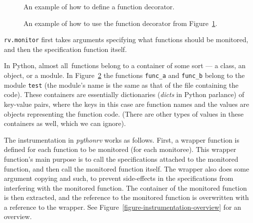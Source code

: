 \documentclass[a4paper,11pt]{kth-mag}
\begin{document}
\begin{figure}[h!]
	\begin{center}
	\begin{minipage}{0.7\textwidth}
	
	\end{minipage}
	\end{center}

	\caption{An example of how to define a function decorator.}
	\label{figure-function-decorator}
\end{figure}

\begin{figure}[h!]
	\begin{center}
	\begin{minipage}{0.7\textwidth}
	
	\end{minipage}
	\end{center}

	\caption{An example of how to use the function decorator from
	Figure~\ref{figure-function-decorator}.}
	\label{figure-function-decorator-usages}
\end{figure}

\texttt{rv.monitor} first takes arguments specifying what functions should be
monitored, and then the specification function itself.

In Python, almost all\footnotemark\ functions belong to a container of some
sort --- a class, an object, or a module. In
Figure~\ref{figure-function-decorator-usages} the functions \texttt{func\_a}
and \texttt{func\_b} belong to the module \texttt{test} (the module's name is
the same as that of the file containing the code). These containers are
essentially dictionaries (\textit{dicts} in Python parlance) of key-value
pairs, where the keys in this case are function names and the values are
objects representing the function code. (There are other types of values in
these containers as well, which we can ignore).


The instrumentation in \textit{pythonrv} works as follows. First, a wrapper
function is defined for each function to be monitored (for each monitoree).
This wrapper function's main purpose is to call the specifications attached to
the monitored function, and then call the monitored function itself. The
wrapper also does some argument copying and such, to prevent side-effects in
the specifications from interfering with the monitored function. The container
of the monitored function is then extracted, and the reference to the monitored
function is overwritten with a reference to the wrapper. See
Figure~\ref{figure-instrumentation-overview} for an overview.
\end{document}
